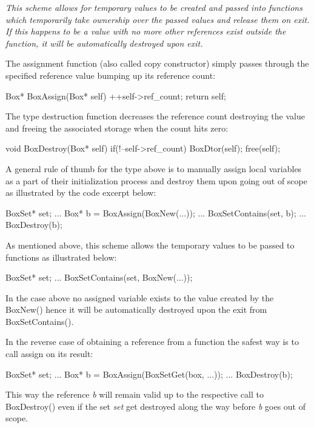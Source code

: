 \documentclass[a4paper]{article}
\newcommand{\meth}[1]{#1}
\begin{document}
\emph{This scheme allows for temporary values to be created and passed into functions which temporarily take ownership over the passed values and release them on exit. If this happens to be a value with no more other references exist outside the function, it will be automatically destroyed upon exit.}


The assignment function (also called copy constructor) simply passes through the specified reference value bumping up its reference count:
\begin{cs}
Box* BoxAssign(Box* self) {
	++self->ref_count;
	return self;
}
\end{cs}


The type destruction function decreases the reference count destroying the value and freeing the associated storage when the count hits zero:


\begin{cs}
void BoxDestroy(Box* self) {
	if(!--self->ref_count) {
		BoxDtor(self);
		free(self);
	}
}
\end{cs}


A general rule of thumb for the type above is to manually assign local variables as a part of their initialization process and destroy them upon going out of scope as illustrated by the code excerpt below:


\begin{cs}
BoxSet* set;
...
{
	Box* b = BoxAssign(BoxNew(...));
	...
	BoxSetContains(set, b);
	...
	BoxDestroy(b);
}
\end{cs}


As mentioned above, this scheme allows the temporary values to be passed to functions as illustrated below:


\begin{cs}
BoxSet* set;
...
BoxSetContains(set, BoxNew(...));
\end{cs}


In the case above no assigned variable exists to the value created by the \meth{BoxNew()} hence it will be automatically destroyed upon the exit from \meth{BoxSetContains()}.


In the reverse case of obtaining a reference from a function the safest way is to call assign on its result:
\begin{cs}
BoxSet* set;
...
{
	Box* b = BoxAssign(BoxSetGet(box, ...));
	...
	BoxDestroy(b);
}
\end{cs}


This way the reference \emph{b} will remain valid up to the respective call to \meth{BoxDestroy()} even if the set \emph{set} get destroyed along the way before \emph{b} goes out of scope.
\end{document}
